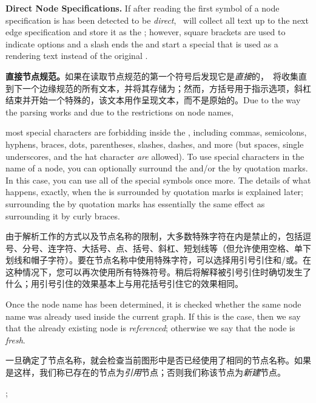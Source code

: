 \medskip
\textbf{Direct Node Specifications.} If after reading the first symbol of a
node specification is has been detected to be \emph{direct}, \tikzname\ will
collect all text up to the next edge specification and store it as the
; however, square brackets are used to indicate options and a
slash ends the  and start a special  that is used as
a rendering text instead of the original .

\textbf{直接节点规范。}如果在读取节点规范的第一个符号后发现它是\emph{直接}的，\tikzname\ 将收集直到下一个边缘规范的所有文本，并将其存储为；然而，方括号用于指示选项，斜杠结束并开始一个特殊的，该文本用作呈现文本，而不是原始的。Due to the way the parsing works and due to the restrictions on node names,

most special characters are forbidding inside the , including
commas, semicolons, hyphens, braces, dots, parentheses, slashes, dashes, and
more (but spaces, single underscores, and the hat character \emph{are}
allowed). To use special characters in the name of a node, you can optionally
surround the  and/or the  by quotation marks. In
this case, you can use all of the special symbols once more. The details of
what happens, exactly, when the  is surrounded by quotation
marks is explained later; surrounding the  by quotation marks has
essentially the same effect as surrounding it by curly braces.

由于解析工作的方式以及节点名称的限制，大多数特殊字符在内是禁止的，包括逗号、分号、连字符、大括号、点、括号、斜杠、短划线等（但允许使用空格、单下划线和帽子字符）。要在节点名称中使用特殊字符，可以选择用引号引住和/或。在这种情况下，您可以再次使用所有特殊符号。稍后将解释被引号引住时确切发生了什么；用引号引住的效果基本上与用花括号引住它的效果相同。

Once the node name has been determined, it is checked whether the same node
name was already used inside the current graph. If this is the case, then we
say that the already existing node is \emph{referenced}; otherwise we say that
the node is \emph{fresh}.

一旦确定了节点名称，就会检查当前图形中是否已经使用了相同的节点名称。如果是这样，我们称已存在的节点为\emph{引用}节点；否则我们称该节点为\emph{新建}节点。


%
\begin{codeexample}[preamble={\usetikzlibrary{graphs}}]
\tikz {};
\end{codeexample}

